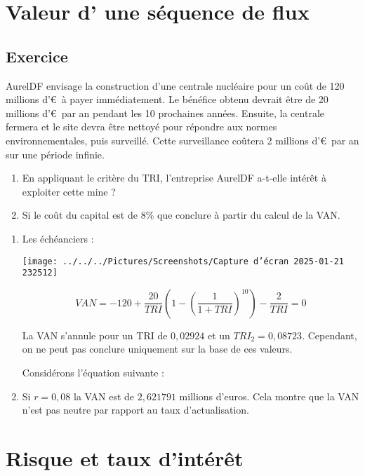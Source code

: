 \documentclass[a4paper, 12pt]{report}
\begin{document}
\section{Valeur d' une séquence de flux}

\subsection{Exercice}

AurelDF envisage la construction d’une centrale nucléaire pour un coût de 120 millions d'\euro~à payer immédiatement. Le bénéfice obtenu devrait être de 20 millions d’\euro~par an pendant les 10 prochaines années. Ensuite, la centrale fermera et le site devra être nettoyé pour répondre aux normes environnementales, puis surveillé. Cette surveillance coûtera 2 millions d’\euro~par an sur une période infinie.

\begin{enumerate}
	\item En appliquant le critère du TRI, l’entreprise AurelDF a-t-elle intérêt à exploiter cette mine ?
	\item Si le coût du capital est de 8\% que conclure à partir du calcul de la VAN.
\end{enumerate} 

\begin{enumerate}
	\item Les échéanciers :
	
\begin{center}
\texttt{[image: ../../../Pictures/Screenshots/Capture d'écran 2025-01-21 232512]}
\end{center}\[
	VAN = -120 + \frac{20}{TRI} \left( 1 - \left( \frac{1}{1 + TRI} \right)^{10} \right) - \frac{2}{TRI} = 0
	\]
	
La VAN s'annule pour un TRI de \( 0,02924 \) et un \( TRI_2 = 0,08723 \). Cependant, on ne peut pas conclure uniquement sur la base de ces valeurs.
	
Considérons l'équation suivante :
\item Si \(  r = 0,08 \) la VAN est de \( 2,621791 \) millions d'euros. Cela montre que la VAN n’est pas neutre par rapport au taux d’actualisation.	
\end{enumerate}

\section{Risque et taux d'intérêt}
\end{document}
